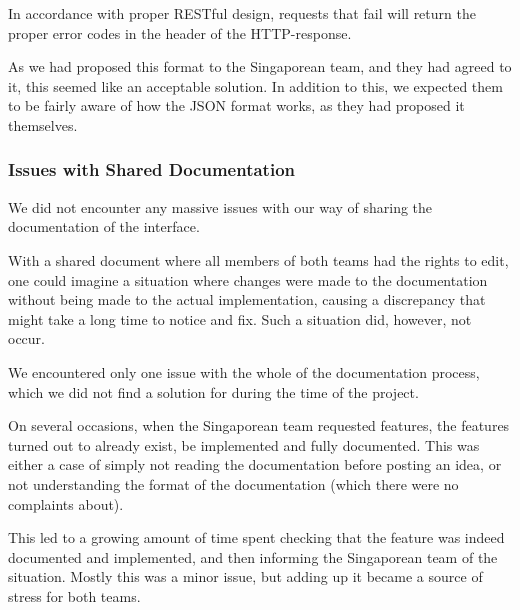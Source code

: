 
In accordance with proper RESTful design, requests that fail will return the proper error codes\cite{restdev}
in the header of the HTTP-response.

As we had proposed this format to the Singaporean team, and they had agreed to it, this seemed like an
acceptable solution. In addition to this, we expected them to be fairly aware of how the JSON format works,
as they had proposed it themselves.

\subsubsection{Issues with Shared Documentation}

We did not encounter any massive issues with our way of sharing the documentation of the interface.

With a shared document where all members of both teams had the rights to edit, one could imagine a situation
where changes were made to the documentation without being made to the actual implementation, causing a
discrepancy that might take a long time to notice and fix. Such a situation did, however, not occur.

We encountered only one issue with the whole of the documentation process, which we did not find a solution for
during the time of the project.

On several occasions, when the Singaporean team requested features, the features turned out to already exist, be
implemented and fully documented. This was either a case of simply not reading the documentation before posting an
idea, or not understanding the format of the documentation (which there were no complaints about).

This led to a growing amount of time spent checking that the feature was indeed documented and implemented, and then
informing the Singaporean team of the situation. Mostly this was a minor issue, but adding up it became a source of
stress for both teams.